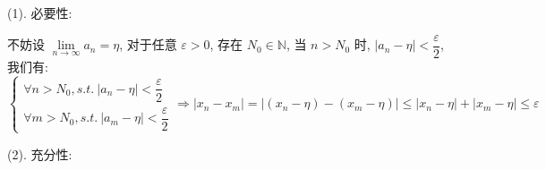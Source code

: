 \begin{proposition}
	
\end{proposition}

\begin{anymark}[证明]
	(1). 必要性:

	不妨设 $\lim\limits_{n\to \infty} a_{n} =\eta$, 对于任意 $\varepsilon > 0$, 存在 $N_{0}\in\mathbb{N}$, 当 $n>N_{0}$ 时, $|a_{n}-\eta|<\dfrac{\varepsilon}{2}$, 我们有:
	$$\begin{cases} 
		\forall n > N_{0}, s.t.\ |a_{n} - \eta| < \dfrac{\varepsilon}{2}\\ 
		\forall m > N_{0}, s.t.\ |a_{m} - \eta| < \dfrac{\varepsilon}{2}
	\end{cases}
	\Rightarrow 
	|x_{n}-x_{m}| = |(x_{n} - \eta) - (x_{m} - \eta)| \leq |x_{n} - \eta| + |x_{m}-\eta| \leq \varepsilon$$

	(2). 充分性:


\end{anymark}

\begin{proposition}[柯西收敛准则:函数]
	
\end{proposition}
